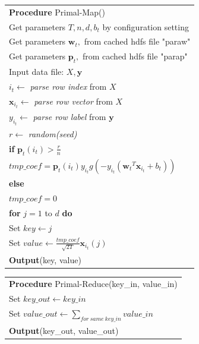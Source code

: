 \documentclass{llncs}
\newcommand{\bw}{\mathbf{w}}
\newcommand{\bp}{\mathbf{p}}
\newcommand{\lc}{\left(}
\newcommand{\rc}{\right)}
\newcommand{\tspace}{\hspace*{2em}}
\begin{document}
    \begin{table}[ht]
	\begin{tabular}{l}
	\hline\noalign{\smallskip}
	\textbf{Procedure} Primal-Map() \\
	\noalign{\smallskip}
	\hline
	\noalign{\smallskip}
        Get parameters $T, n, d, b_t$  by configuration setting \\
        Get parameters $\bw_t,$ from cached hdfs file "paraw" \\
        Get parameters $\bp_t,$ from cached hdfs file "parap" \\
        Input data file: $X, \mathbf{y}$ \\
        $i_t \leftarrow$ \textit{parse row index} from $X$ \\
        $\mathbf{x}_{i_t} \leftarrow$ \textit{parse row vector} from $X$ \\
        $y_{i_t} \leftarrow$ \textit{parse row label} from $\mathbf{y}$ \\
        $r \leftarrow$ \textit{random(seed)} \\
        \textbf{if} $\bp_t(i_t) > \frac{r}{n}$ \\
        \tspace $tmp\_coef=\bp_t(i_t){y}_{{i}_{t}}g\lc-{y}_{{i}_{t}}\lc {{\bw}_{t}}^{T}{\mathbf{x}}_{i_t}+{b}_{t} \rc\rc$ \\
        \textbf{else} \\
        \tspace $tmp\_coef=0$ \\
        \textbf{for} $j=1$ to $d$ \textbf{do} \\
        \tspace Set $key \leftarrow j$ \\
        \tspace Set $value \leftarrow \frac{tmp\_coef}{\sqrt{2T}}\mathbf{x}_{i_t}(j) $ \\
        \tspace \textbf{Output}(key, value) \\
	\hline
	\end{tabular}
	\end{table}

    \begin{table}[ht]
	\begin{tabular}{l}
	\hline\noalign{\smallskip}
	\textbf{Procedure} Primal-Reduce(key\_in, value\_in) \\
	\noalign{\smallskip}
	\hline
	\noalign{\smallskip}
        Set $key\_out \leftarrow key\_in$ \\
        Set $value\_out \leftarrow \sum_{for~same~key\_in}{value\_in} $ \\
        \textbf{Output}(key\_out, value\_out) \\
	\hline
	\end{tabular}
	\end{table}
\end{document}
